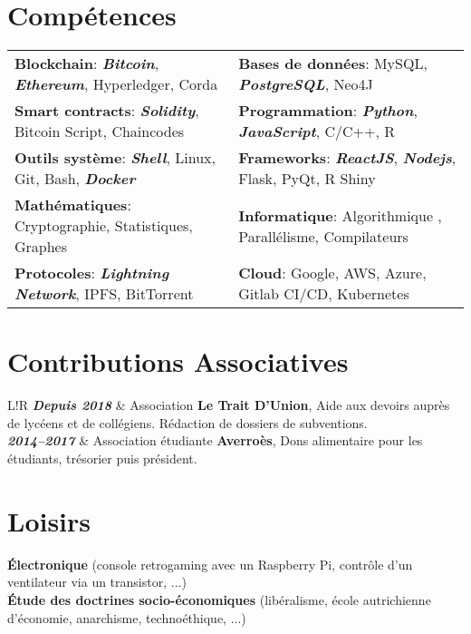 \documentclass[10pt]{article}
\newcommand\VRule{\color{lightgray}\vrule width 2pt}
\begin{document}
 
\section*{Compétences}
\begin{tabular}{ l l }
\textbf{Blockchain}: \textbf{\textit{Bitcoin}}, \textbf{\textit{Ethereum}}, Hyperledger, Corda & \textbf{Bases de données}: MySQL, \textbf{\textit{PostgreSQL}}, Neo4J \\[0.1cm]
\textbf{Smart contracts}: \textbf{\textit{Solidity}}, Bitcoin Script, Chaincodes & \textbf{Programmation}: \textbf{\textit{Python}}, \textbf{\textit{JavaScript}}, C/C++, R  \\[0.1cm]
\textbf{Outils système}: \textbf{\textit{Shell}}, Linux, Git, Bash, \textbf{\textit{Docker}} & \textbf{Frameworks}: \textbf{\textit{ReactJS}}, \textbf{\textit{Nodejs}}, Flask, PyQt, R Shiny \\[0.1cm]
\textbf{Mathématiques}: Cryptographie, Statistiques, Graphes & \textbf{Informatique}: Algorithmique , Parallélisme, Compilateurs \\[0.1cm]
\textbf{Protocoles}: \textbf{\textit{Lightning Network}}, IPFS, BitTorrent & \textbf{Cloud}: Google, AWS, Azure, Gitlab CI/CD, Kubernetes
\end{tabular}

\section*{Contributions Associatives}
\begin{tabular}{L!{\VRule}R}
\textbf{\textit{Depuis 2018}} & Association \textbf{Le Trait D’Union}, Aide aux devoirs auprès de lycéens et de collégiens. Rédaction de dossiers de subventions. \\[0.75cm]

\textbf{\textit{2014--2017}} & Association étudiante \textbf{Averroès}, Dons alimentaire pour les étudiants, trésorier puis président. \\
\end{tabular}
\section*{Loisirs}
\hspace*{1ex} \textbf{Électronique} (console retrogaming avec un Raspberry Pi, contrôle d'un ventilateur via un transistor, ...) \\
\hspace*{1ex} \textbf{Étude des doctrines socio-économiques} (libéralisme, école autrichienne d'économie, anarchisme, technoéthique, ...) \\
\end{document}
